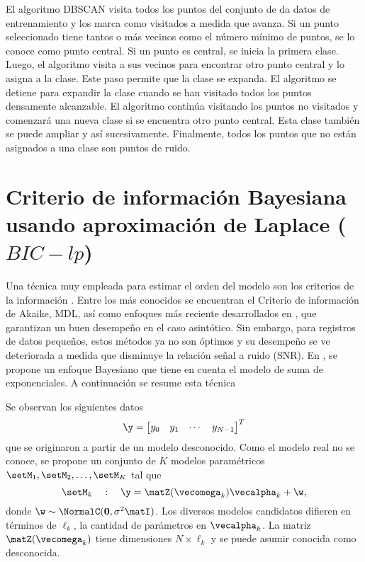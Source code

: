 El algoritmo DBSCAN visita todos los puntos del conjunto de da datos de entrenamiento y los marca como visitados a medida que avanza. Si un punto seleccionado tiene tantos o más vecinos como el número mínimo de puntos, se lo conoce como punto central. Si un punto es central, se inicia la primera clase. Luego, el algoritmo visita a sus vecinos para encontrar otro punto central y lo asigna a la clase. Este paso permite que la clase se expanda. El algoritmo se detiene para expandir la clase cuando se han visitado todos los puntos densamente alcanzable. El algoritmo continúa visitando los puntos no visitados y comenzará una nueva clase si se encuentra otro punto central. Esta clase también se puede ampliar y así sucesivamente. Finalmente, todos los puntos que no están asignados a una clase son puntos de ruido.

	\section{Criterio de información Bayesiana usando aproximación de Laplace ($BIC-lp$)}\label{BIC_Appendix}
	
	Una técnica muy empleada para estimar el orden del modelo son los criterios de la información \cite{Stoica2004}. Entre los más conocidos se encuentran el Criterio de información de Akaike, MDL, así como enfoques más reciente desarrollados en \cite{Mariani2015, Nielsen2013}, que garantizan un buen desempeño en el caso asintótico. Sin embargo, para registros de datos pequeños, estos métodos ya no son óptimos y su desempeño se ve deteriorada a medida que disminuye la relación señal a ruido (SNR). En \cite{Nielsen2013}, se propone un enfoque Bayesiano que tiene en cuenta el modelo de suma de exponenciales. A continuación se resume esta técnica
	
	Se observan los siguientes datos
	\begin{equation}
		\y = \begin{bmatrix} y_0 & y_1 & \cdots & y_{N-1}
		\end{bmatrix}^T
		\label{eq:BIC1}
	\end{equation}
	que se originaron a partir de un modelo desconocido. Como el modelo real no se conoce, se propone un conjunto de $K$ modelos paramétricos $\setM_1,\setM_2,\ldots,\setM_K$ tal que
	\begin{equation}
		\setM_k\quad : \quad \y = \matZ(\vecomega_k)\vecalpha_k + \w,
		\label{eq:BIC2} 
	\end{equation}
	donde $\w\sim\NormalC(\mathbf{0},\sigma^2\matI)$. Los diversos modelos candidatos difieren en términos de $\ell_k$, la cantidad de parámetros en $\vecalpha_k$. La matriz $\matZ(\vecomega_k)$ tiene dimensiones $N\times \ell_k$ y se puede asumir conocida como desconocida.
	
